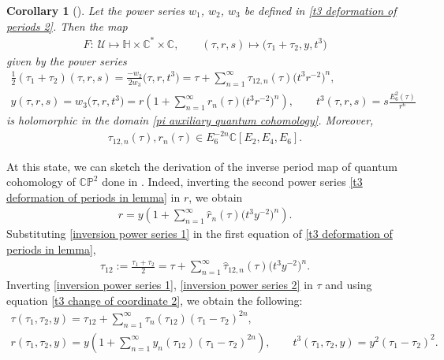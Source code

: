 \documentclass[11pt]{article}
\numberwithin{equation}{section}
\numberwithin{equation}{section}
\newtheorem{Corollary}[Theorem]{Corollary}
\begin{document}
\begin{Corollary}[{\cite{Milanov}}]\label{lemma Milanov deformation corollary}
Let the power series $w_1$, $w_2$, $w_3$ be defined in \eqref{t3 deformation of periods 2}. Then the map
\begin{gather}\label{change of coordinate tau,r,s to tau1,tau2,t3}
 F\colon\ \mathcal{U}\mapsto \mathbb{H}\times \mathbb{C}^{*}\times \mathbb{C}, \qquad (\tau,r,s)\mapsto \bigl(\tau_1+\tau_2,y, t^3\bigr)
 \end{gather}
given by the power series
\begin{gather}
\frac{1}{2}(\tau_1+\tau_2)(\tau,r,s)=\frac{-w_2}{2w_3}\bigl(\tau,r,t^3\bigr)=\tau+\sum_{n=1}^{\infty} \tau_{12,n}(\tau) \bigl(t^3r^{-2}\bigr)^n ,\nonumber\\
y(\tau,r,s)=w_3\bigl(\tau,r,t^3\bigr)=r\left( 1+\sum_{n=1}^{\infty} r_n(\tau)\bigl(t^3r^{-2}\bigr)^n \right),\qquad
t^3(\tau,r,s)=s\frac{E_6^2(\tau)}{r^6}\label{t3 deformation of periods in lemma}
\end{gather}
 is holomorphic in the domain \eqref{pi auxiliary quantum cohomology}.
 Moreover,
\begin{gather}\label{coefficients of tau12 inside corollary Milanov}
 \tau_{12,n}(\tau) ,r_n(\tau) \in E_6^{-2n}\mathbb{C}[ E_2,E_4,E_6] .
\end{gather}
\end{Corollary}

At this state, we can sketch the derivation of the inverse period map of quantum cohomology of $\mathbb{CP}^2$ done in \cite[Section 5.4]{Milanov}. Indeed, inverting the second power series \eqref{t3 deformation of periods in lemma} in $r$, we obtain
\begin{gather}
r=y\left( 1+\sum_{n=1}^{\infty} \hat r_n(\tau)\bigl(t^3y^{-2}\bigr)^n \right).\label{inversion power series 1}
\end{gather}
Substituting \eqref{inversion power series 1} in the first equation of \eqref{t3 deformation of periods in lemma},
\begin{gather}\label{inversion power series 2}
\tau_{12}:=\frac{\tau_1+\tau_2}{2}=\tau+\sum_{n=1}^{\infty} \hat\tau_{12,n}(\tau) \bigl(t^3y^{-2}\bigr)^n .
\end{gather}
Inverting \eqref{inversion power series 1}, \eqref{inversion power series 2} in $\tau$ and using equation \eqref{t3 change of coordinate 2}, we obtain the following:
\begin{gather}
\tau(\tau_1,\tau_2,y)=\tau_{12}+\sum_{n=1}^{\infty} \tau_{n}(\tau_{12}) (\tau_1-\tau_2)^{2n} ,\nonumber\\
r(\tau_1,\tau_2,y)=y\left( 1+\sum_{n=1}^{\infty} y_n(\tau_{12})(\tau_1-\tau_2)^{2n} \right),\qquad
t^3(\tau_1,\tau_2,y)=y^2(\tau_1-\tau_2)^2.\label{t3 deformation of periods to compose}
\end{gather}
\end{document}
